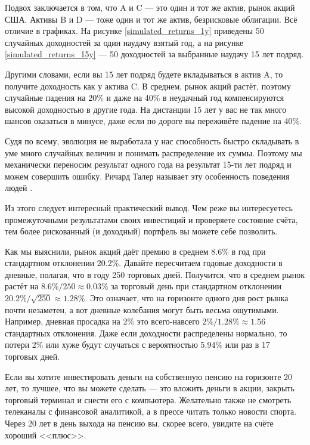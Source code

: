 Подвох заключается в том, что A и C --- это один и тот же актив, рынок акций США. Активы B и D --- тоже один и тот же актив, безрисковые облигации. Всё отличие в графиках. На рисунке \ref{simulated_returns_1y} приведены 50 случайных доходностей за один наудачу взятый год, а на рисунке \ref{simulated_returns_15y} --- 50 доходностей за выбранные наудачу 15 лет подряд.

Другими словами, если вы 15 лет подряд будете вкладываться в актив A, то получите доходность как у актива C. В среднем, рынок акций растёт, поэтому случайные падения на 20\% и даже на 40\% в неудачный год компенсируются высокой доходностью в другие года. На дистанции 15 лет у вас не так много шансов оказаться в минусе, даже если по дороге вы переживёте падение на 40\%.

Судя по всему, эволюция не выработала у нас способность быстро складывать в уме много случайных величин и понимать распределение их суммы. Поэтому мы механически переносим результат одного года на результат 15-ти лет подряд и можем совершить ошибку. Ричард Талер называет эту особенность поведения людей  \cite{benartzi1995myopic}\cite[ch.~20]{thaler2015misbehaving}.

Из этого следует интересный практический вывод. Чем реже вы интересуетесь промежуточными результатами своих инвестиций и проверяете состояние счёта, тем более рискованный (и доходный) портфель вы можете себе позволить.

Как мы выяснили, рынок акций даёт премию в среднем 8.6\% в год при стандартном отклонении 20.2\%. Давайте пересчитаем годовые доходности в дневные, полагая, что в году 250 торговых дней. Получится, что в среднем рынок растёт на
$8.6\% / 250 \approx 0.03\%$ за торговый день при стандартном отклонении $20.2\% / \sqrt{250} \approx 1.28\%$. Это означает, что на горизонте одного дня рост рынка почти незаметен, а вот дневные колебания могут быть весьма ощутимыми. Например, дневная просадка на 2\% это всего-навсего $2\%/1.28\% \approx 1.56$ стандартных отклонения. Даже если доходности распределены нормально, то потери 2\% или хуже будут случаться с вероятностью $5.94\%$ или раз в 17 торговых дней.

Если вы хотите инвестировать деньги на собственную пенсию на горизонте 20 лет, то лучшее, что вы можете сделать --- это вложить деньги в акции, закрыть торговый терминал и снести его с компьютера. Желательно также не смотреть телеканалы с финансовой аналитикой, а в прессе читать только новости спорта. Через 20 лет в день выхода на пенсию вы, скорее всего, увидите на счёте хороший <<плюс>>.

